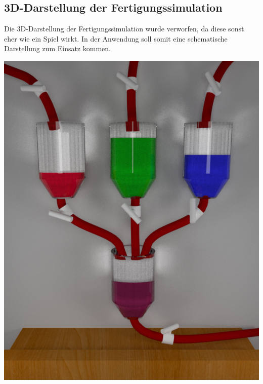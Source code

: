 \documentclass[parskip=full]{scrartcl}
\begin{document}
\subsection{3D-Darstellung der Fertigungssimulation}
Die 3D-Darstellung der Fertigungssimulation wurde verworfen, da diese sonst eher wie ein Spiel wirkt.
In der Anwendung soll somit eine schematische Darstellung zum Einsatz kommen.
\begin{center}
  \includegraphics[scale=0.3]{./media/ui-sketch-server-3d.png}
\end{center}

\pagebreak
\printglossaries
\end{document}
